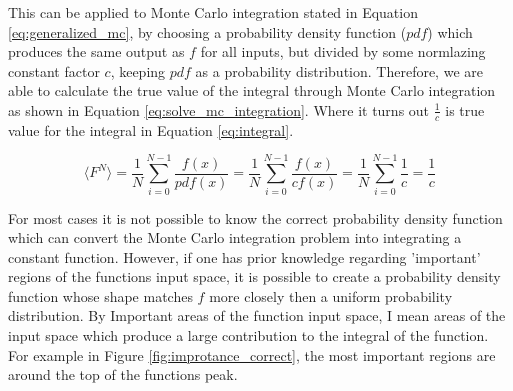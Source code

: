 \documentclass[ %
                    author={Callum Pearce},
                supervisor={Dr. Neill Campbell},
                    degree={MEng},
                     title={How effective are Temporal difference learning methods for reducing the number of zero contribution light paths, while still accurately approximating Global Illumination in Path tracing?},
                  subtitle={},
                      type={research},
                      year={2019} ]{dissertation}
\begin{document}
This can be applied to Monte Carlo integration stated in Equation \ref{eq:generalized_mc}, by choosing a probability density function ($pdf$) which produces the same output as $f$ for all inputs, but divided by some normlazing constant factor $c$, keeping $pdf$ as a probability distribution. Therefore, we are able to calculate the true value of the integral through Monte Carlo integration as shown in Equation \ref{eq:solve_mc_integration}. Where it turns out $\frac{1}{c}$ is true value for the integral in Equation \ref{eq:integral}.

\begin{equation}
\label{eq:solve_mc_integration}
\langle F^N \rangle = \frac{1}{N} \sum^{N-1}_{i=0} \frac{f(x)}{pdf(x)} = \frac{1}{N} \sum^{N-1}_{i=0} \frac{f(x)}{cf(x)} =  \frac{1}{N} \sum^{N-1}_{i=0} \frac{1}{c} = \frac{1}{c}
\end{equation}

For most cases it is not possible to know the correct probability density function which can convert the Monte Carlo integration problem into integrating a constant function. However, if one has prior knowledge regarding 'important' regions of the functions input space, it is possible to create a probability density function whose shape matches $f$ more closely then a uniform probability distribution. By Important areas of the function input space, I mean areas of the input space which produce a large contribution to the integral of the function. For example in Figure \ref{fig:improtance_correct}, the most important regions are around the top of the functions peak. 
\end{document}
